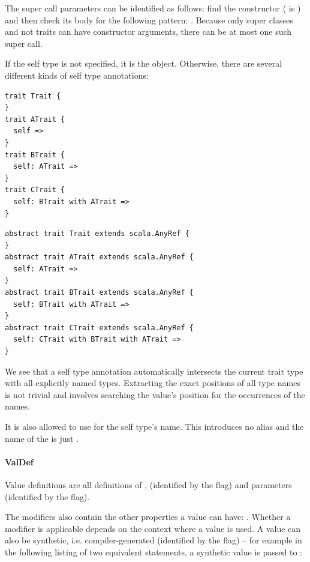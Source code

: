 The super call parameters can be identified as follows: find the constructor  ( is ) and then check its body  for the following pattern: . Because only super classes and not traits can have constructor arguments, there can be at most one such super call.

If the self type is not specified, it is the  object. Otherwise, there are several different kinds of self type annotations:

\begin{multicols}{2}
\begin{lstlisting}
trait Trait {
}
trait ATrait {
  self =>
}
trait BTrait {
  self: ATrait =>
}
trait CTrait {
  self: BTrait with ATrait =>
}
\end{lstlisting}
\begin{lstlisting}
abstract trait Trait extends scala.AnyRef {
}
abstract trait ATrait extends scala.AnyRef { 
  self: ATrait => 
}
abstract trait BTrait extends scala.AnyRef {
  self: BTrait with ATrait =>
}
abstract trait CTrait extends scala.AnyRef {
  self: CTrait with BTrait with ATrait =>
}
\end{lstlisting}
\end{multicols}

We see that a self type annotation automatically intersects the current trait type with all explicitly named types. Extracting the exact positions of all type names is not trivial and involves searching the value's position for the occurrences of the names.

It is also allowed to use  for the self type's name. This introduces no alias and the name of the  is just \src{\_}.

\paragraph{ValDef} 

\noindent Value definitions are all definitions of ,  (identified by the \textsc{} flag) and parameters (identified by the \textsc{} flag).

The modifiers also contain the other properties a value can have: . Whether a modifier is applicable depends on the context where a value is used. A value can also be synthetic, i.e. compiler-generated (identified by the \textsc{} flag) -- for example in the following listing of two equivalent statements, a synthetic value is passed to :

